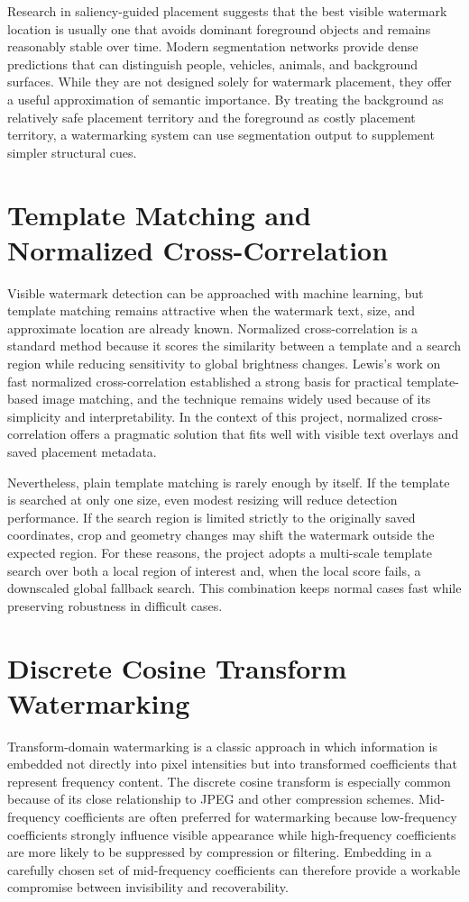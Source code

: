 \documentclass[12pt,oneside]{report}
\begin{document}
Research in saliency-guided placement suggests that the best visible watermark location is usually one that avoids dominant foreground objects and remains reasonably stable over time. Modern segmentation networks provide dense predictions that can distinguish people, vehicles, animals, and background surfaces. While they are not designed solely for watermark placement, they offer a useful approximation of semantic importance. By treating the background as relatively safe placement territory and the foreground as costly placement territory, a watermarking system can use segmentation output to supplement simpler structural cues.

\section{Template Matching and Normalized Cross-Correlation}
Visible watermark detection can be approached with machine learning, but template matching remains attractive when the watermark text, size, and approximate location are already known. Normalized cross-correlation is a standard method because it scores the similarity between a template and a search region while reducing sensitivity to global brightness changes. Lewis's work on fast normalized cross-correlation established a strong basis for practical template-based image matching, and the technique remains widely used because of its simplicity and interpretability. In the context of this project, normalized cross-correlation offers a pragmatic solution that fits well with visible text overlays and saved placement metadata.

Nevertheless, plain template matching is rarely enough by itself. If the template is searched at only one size, even modest resizing will reduce detection performance. If the search region is limited strictly to the originally saved coordinates, crop and geometry changes may shift the watermark outside the expected region. For these reasons, the project adopts a multi-scale template search over both a local region of interest and, when the local score fails, a downscaled global fallback search. This combination keeps normal cases fast while preserving robustness in difficult cases.

\section{Discrete Cosine Transform Watermarking}
Transform-domain watermarking is a classic approach in which information is embedded not directly into pixel intensities but into transformed coefficients that represent frequency content. The discrete cosine transform is especially common because of its close relationship to JPEG and other compression schemes. Mid-frequency coefficients are often preferred for watermarking because low-frequency coefficients strongly influence visible appearance while high-frequency coefficients are more likely to be suppressed by compression or filtering. Embedding in a carefully chosen set of mid-frequency coefficients can therefore provide a workable compromise between invisibility and recoverability.
\end{document}

